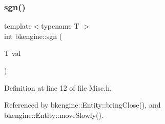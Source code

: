 \subsubsection{\texorpdfstring{sgn()}{sgn()}}
{\footnotesize\ttfamily template$<$typename T $>$ \\
int bkengine\+::sgn (\begin{DoxyParamCaption}\item[{T}]{val }\end{DoxyParamCaption})}



Definition at line 12 of file Misc.\+h.



Referenced by bkengine\+::\+Entity\+::bring\+Close(), and bkengine\+::\+Entity\+::move\+Slowly().

